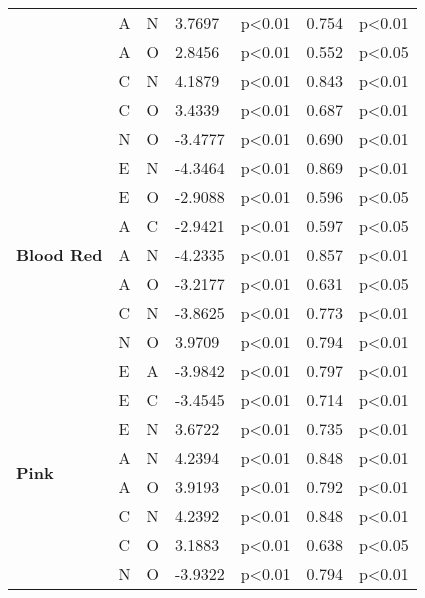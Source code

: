 \begin{longtable}{ |p{1.9cm}| p{0.5cm}|p{0.5cm}|p{1.2cm}| p{1.9cm}|p{1cm}|p{1.5cm}|  }
    &A			&N				&3.7697			&p<0.01			&0.754		&p<0.01\\
    &A			&O				&2.8456			&p<0.01			&0.552		&p<0.05\\
    &C			&N				&4.1879			&p<0.01			&0.843		&p<0.01\\
    &C			&O				&3.4339			&p<0.01			&0.687		&p<0.01\\
    &N			&O				&-3.4777			&p<0.01			&0.690 		&p<0.01\\
    \hline
    \hline
    \multirow{7}{*}{\textbf{Blood Red}}
    &E			&N				&-4.3464			&p<0.01			&0.869		&p<0.01\\
    &E			&O				&-2.9088			&p<0.01			&0.596		&p<0.05\\
    &A			&C				&-2.9421			&p<0.01			&0.597		&p<0.05\\
    &A			&N				&-4.2335			&p<0.01			&0.857		&p<0.01\\
    &A			&O				&-3.2177			&p<0.01			&0.631		&p<0.05\\
    &C			&N				&-3.8625			&p<0.01			&0.773		&p<0.01\\
    &N			&O				&3.9709			&p<0.01			&0.794		&p<0.01\\
    \hline
    \hline
    \multirow{8}{*}{\textbf{Pink}}
    &E			&A				&-3.9842			&p<0.01			&0.797		&p<0.01\\
    &E			&C				&-3.4545			&p<0.01			&0.714		&p<0.01\\
    &E			&N				&3.6722			&p<0.01			&0.735		&p<0.01\\
    &A			&N				&4.2394			&p<0.01			&0.848		&p<0.01\\
    &A			&O				&3.9193			&p<0.01			&0.792		&p<0.01\\
    &C			&N				&4.2392			&p<0.01			&0.848		&p<0.01\\
    &C			&O				&3.1883			&p<0.01			&0.638		&p<0.05\\
    &N			&O				&-3.9322			&p<0.01			&0.794		&p<0.01\\
    \hline
\end{longtable}

